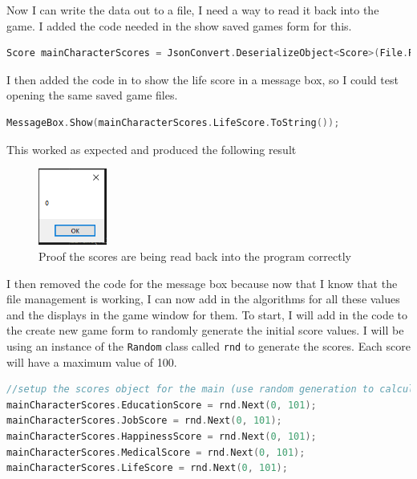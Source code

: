 \noindent Now I can write the data out to a file, I need a way to read it back into the game. I added the code needed in the show saved games form for this.
\begin{lstlisting}[language=c, style=csharp, caption=Code to read mainCharacterScores back in]
Score mainCharacterScores = JsonConvert.DeserializeObject<Score>(File.ReadAllText(filepath + "\\mainCharacterScores.json"));
\end{lstlisting}
I then added the code in to show the life score in a message box, so I could test opening the same saved game files.
\begin{lstlisting}[language=c, style=csharp, caption=Test code to make sure code above is working]
MessageBox.Show(mainCharacterScores.LifeScore.ToString());
\end{lstlisting}
This worked as expected and produced the following result
\begin{figure}[H]
    \centering
    \includegraphics[width=0.2\textwidth]{images/implementation/scoresTest2.png}
    \caption{Proof the scores are being read back into the program correctly}
    \label{fig:implementation-scoresTest2}
\end{figure}
\noindent I then removed the code for the message box because now that I know that the file management is working, I can now add in the algorithms for all these values and the displays in the game window for them. To start, I will add in the code to the create new game form to randomly generate the initial score values. I will be using an instance of the \verb|Random| class called \verb|rnd| to generate the scores. Each score will have a maximum value of 100.
\begin{lstlisting}[language=c, style=csharp, caption=Setting the score values random values]
//setup the scores object for the main (use random generation to calculate values)
mainCharacterScores.EducationScore = rnd.Next(0, 101);
mainCharacterScores.JobScore = rnd.Next(0, 101);
mainCharacterScores.HappinessScore = rnd.Next(0, 101);
mainCharacterScores.MedicalScore = rnd.Next(0, 101);
mainCharacterScores.LifeScore = rnd.Next(0, 101);
\end{lstlisting}
